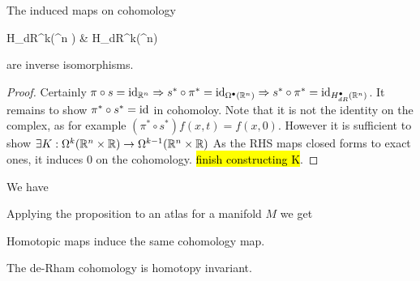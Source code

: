 \documentclass{article}
\begin{document}
\begin{prop}
	The induced maps on cohomology
\begin{tkz}
	H_{dR}^k(^n \times {})  & H_{dR}^k(^n) 	
\end{tkz}	
	 are inverse isomorphisms. 
\end{prop}
\begin{proof}
	Certainly $\pi \circ s = \operatorname{id}_{\mathbb{R}^n} \Rightarrow s^\ast \circ \pi^\ast = \operatorname{id}_{\Omega^\bullet(\mathbb{R}^n)} \Rightarrow s^\ast \circ \pi^\ast = \operatorname{id}_{H_{dR}^\bullet(\mathbb{R}^n)}$. It remains to show $\pi^\ast \circ s^\ast = \operatorname{id}$ in cohomoloy. Note that it is not the identity on the complex, as for example $(\pi^\ast \circ s^\ast)f(x,t) = f(x,0)$. However it is sufficient to show $\exists K:\Omega^k(\mathbb{R}^n \times \mathbb{R}) \to \Omega^{k-1}(\mathbb{R}^n \times \mathbb{R})$
As the RHS maps closed forms to exact ones, it induces $0$ on the cohomology. \hl{finish constructing K}. 
\end{proof}

\begin{corollary}
	We have 
\end{corollary}

\begin{corollary}
	Applying the proposition to an atlas for a manifold $M$ we get 

\end{corollary}

\begin{corollary}
	Homotopic maps induce the same cohomology map. 
\end{corollary}
\begin{comment}
\begin{proof}
	$f,g : M \to N$ are homotopic if $\exists F:M \times I \to N$ restricting to $f,g$ at either end of the interval. Extend to a map $M \times \mbb{R}$, construct $f,g$ from $F$ using sections and pullback. 
\end{proof}
\end{comment}

\begin{corollary}
	The de-Rham cohomology is homotopy invariant. 
\end{corollary}
\end{document}
